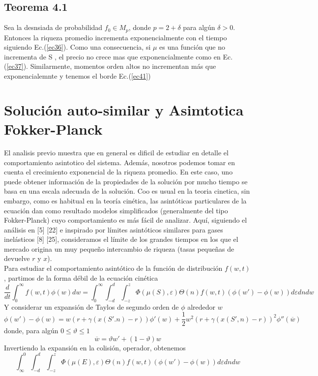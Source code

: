 \documentclass[12pt,a4paper]{article}
\begin{document}
\subsection*{Teorema 4.1}
Sea la desnsiada de probabilidad $f_0\in M_p$, donde $p=2+\delta$ para algún $\delta > 0$. Entonces la riqueza promedio incrementa exponencialmente con el tiempo siguiendo Ec.(\ref{ec36}). Como una consecuencia, si $\mu$ es una función que no incrementa de S
, el precio no crece mas que exponencialmente como en Ec.(\ref{ec37}). Similarmente, momentos orden altos no incrementan más que exponencialemnte y tenemos el borde Ec.(\ref{ec41})
\section*{Solución auto-similar y Asimtotica Fokker-Planck}
\quad El analisis previo muestra que en general es dificil de estudiar en detalle el comportamiento asintotico del sistema. Además, nosotros podemos tomar en cuenta el crecimiento exponencial de la riqueza promedio. En este caso, uno puede obtener información de la propiedades de la solución por mucho tiempo se basa en una escala adecuada de la solución. Coo es usual en la teoria cinetica, sin embargo, como es habitual en la teoría cinética, las asintóticas particulares de la ecuación dan como resultado modelos simplificados (generalmente del tipo Fokker-Planck) cuyo comportamiento es más fácil de analizar. Aquí, siguiendo el análisis en [5] [22] e inspirado por límites asintóticos similares para gases inelásticos [8] [25], consideramos el límite de los grandes tiempos en los que el mercado origina un muy pequeño intercambio de riqueza (tasas pequeñas de devuelve $ r $ y $ x $). \\
\quad Para estudiar el comportamiento asintótico de la función de distribución $ f (w, t) $, partimos de la forma débil de la ecuación cinética
\begin{equation}
\frac{d}{dt}\int^{\infty}_{0}f(w,t) \phi(w)dw=\int^{\infty}_{0}\int^{d}_{-d}\int^{z}_{-z}\Phi(\mu(S),\varepsilon)\Theta(n)f(w,t)(\phi(w')-\phi(w))d\varepsilon dndw\label{2.42}
\end{equation} 
Y considerar un expansión de Taylos de segundo orden de $\phi$ alrededor $w$
$$
\phi(w')-\phi(w)=w(r+\gamma(x(S'.n)-r))\phi'(w)+\frac{1}{2}w^{2}(r+\gamma(x(S',n)-r))^{2}\phi''(\overline{w})
$$
donde, para algún $0\leq \vartheta \leq 1$
$$
\overline{w}=\vartheta w' +(1-\vartheta)w
$$
Invertiendo la expansión en la colisión, operador, obtenemos
$$ \int^{0}_{\infty} \int^{d}_{-d} \int^{z}_{-z}\Phi(\mu(E),\varepsilon)\Theta(n)f(w,t)(\phi(w')-\phi(w))d\varepsilon dn dw$$
\end{document}
